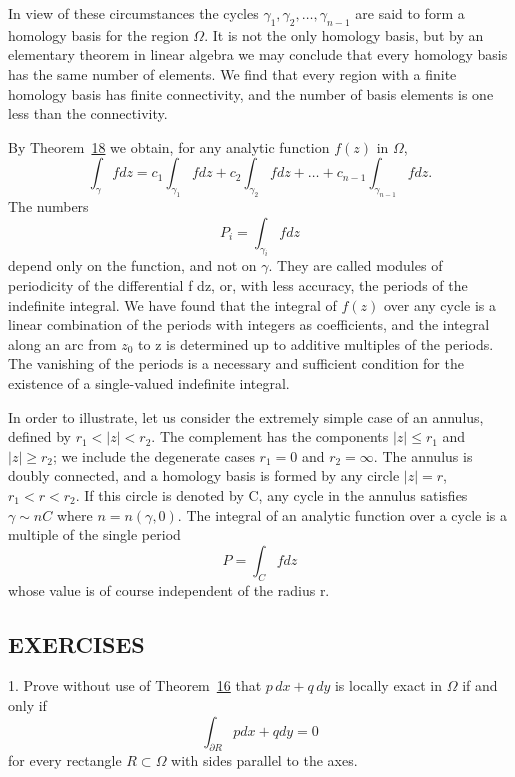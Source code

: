 In view of these circumstances the cycles $\gamma_{1}, \gamma_{2}, \ldots, \gamma_{n-1}$ are said to form a homology basis for the region $\Omega$. It is not the only homology basis, but by an elementary theorem in linear algebra we may conclude that every homology basis has the same number of elements. We find that every region with a finite homology basis has finite connectivity, and the number of basis elements is one less than the connectivity.

By Theorem~\hyperref[thm:4.18]{18} we obtain, for any analytic function $f(z)$ in $\Omega$,
\begin{equation*}
\int_ {\gamma} f d z = c _ {1} \int_ {\gamma_ {1}} f d z + c _ {2} \int_ {\gamma_ {2}} f d z + \dots + c _ {n - 1} \int_ {\gamma_ {n - 1}} f d z.
\end{equation*}
The numbers
\begin{equation*}
P _ {i} = \int_ {\gamma_ {i}} f d z
\end{equation*}
depend only on the function, and not on $\gamma$. They are called modules of periodicity of the differential f dz, or, with less accuracy, the periods of the indefinite integral. We have found that the integral of $f(z)$ over any cycle is a linear combination of the periods with integers as coefficients, and the integral along an arc from $z_{0}$ to z is determined up to additive multiples of the periods. The vanishing of the periods is a necessary and sufficient condition for the existence of a single-valued indefinite integral.

In order to illustrate, let us consider the extremely simple case of an annulus, defined by $r_{1} < |z| < r_{2}$. The complement has the components $|z| \leq r_{1}$ and $|z| \geq r_{2}$; we include the degenerate cases $r_{1} = 0$ and $r_{2} = \infty$. The annulus is doubly connected, and a homology basis is formed by any circle $|z| = r$, $r_{1} < r < r_{2}$. If this circle is denoted by C, any cycle in the annulus satisfies $\gamma \sim nC$ where $n = n(\gamma, 0)$. The integral of an analytic function over a cycle is a multiple of the single period
\begin{equation*}
P = \int_ {C} f d z
\end{equation*}
whose value is of course independent of the radius r.

\subsection*{EXERCISES}
1. Prove without use of Theorem~\hyperref[thm:4.16]{16} that $p \, dx + q \, dy$ is locally exact in $\Omega$ if and only if
\begin{equation*}
\int_ {\partial R} p d x + q d y = 0
\end{equation*}
for every rectangle $R \subset \Omega$ with sides parallel to the axes.

